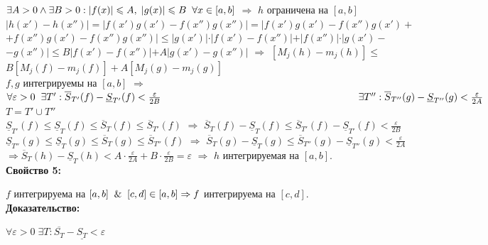 \documentclass[a4paper,12pt]{article} %
\renewcommand {\leq}{\leqslant}
\begin{document}
	$ \exists A > 0 \wedge  \exists B > 0: |f(x)| \leq A, \hspace*{1mm} |g(x)| \leq B \hspace*{2mm} \forall x \in [a, b]$ $\Rightarrow$ $ h $ ограничена на $ [a, b]$ \\ [2 mm]
	$| h(x') - h(x'') | = | f(x')g(x') - f(x'')g(x'')| = |f(x')g(x') - f(x'')g(x') + $ \\ [2 mm] $+ f(x'')g(x') - f(x'')g(x'') | \leq |g(x')| \cdot |f(x') - f(x'')| + |f(x'')| \cdot | g(x') - $ \\ [2 mm] $ - g(x'') | \leq B|f(x') - f(x'')| + A|g(x') - g(x'')| $ $\Rightarrow$  $[ M_j(h) - m_j(h)] \leq $ \\ [2mm] $  B[M_j(f) - m_j(f)] + A[M_j(g) - m_j(g)] $ \\ [3 mm]
	$ f, g $ интегрируемы на $ [a, b] $ $ \Rightarrow $ $ \forall \varepsilon > 0 \hspace*{2mm} \exists T' : \overline{S}_{T'}(f) - \underline{S}_{T'} (f) < \frac {\varepsilon}{2B} \\ [2 mm] \hspace*{70mm} \exists T'' : \overline{S}_{T''}(g) - \underline{S}_{T''} (g) < \frac {\varepsilon}{2A} $ \\ [3 mm]
	$ T = T' \cup T''$ \\ [2 mm]
	$ \underline{S}_{T'}(f) \leq \underline{S}_{T}(f) \leq \overline{S}_{T}(f) \leq \overline{S}_{T'}(f) $ $ \Rightarrow $ $\overline{S}_{T}(f) - \underline{S}_{T} (f)  \leq \overline{S}_{T'}(f) - \underline{S}_{T'} (f) < \frac {\varepsilon}{2B} $ \\ [2 mm]
	$ \underline{S}_{T''}(g) \leq \underline{S}_{T}(g) \leq \overline{S}_{T}(g) \leq \overline{S}_{T''}(f) $ $ \Rightarrow $ $\overline{S}_{T}(g) - \underline{S}_{T} (g)  \leq \overline{S}_{T''}(g) - \underline{S}_{T''} (g) < \frac {\varepsilon}{2A} $ \\
	
	$\Rightarrow  \overline{S}_{T}(h) - \underline{S}_{T} (h) < A \cdot \frac {\varepsilon}{2A} + B \cdot \frac{\varepsilon}{2B} = \varepsilon$ $\Rightarrow$ $ h $ интегрируемая на $ [a, b] $.\\
	
	\textbf{Свойство 5:}
	
	$f$ интегрируема на $[a,b] \And [c,d] \in [a,b]\Rightarrow f$ интегрируема на $[c,d]$.\\
	
	\textbf{Доказательство:}
	
	$\forall \varepsilon > 0 \; \exists T: \overline{S_T}- \underline{S_T}< \varepsilon$
	
\end{document}
